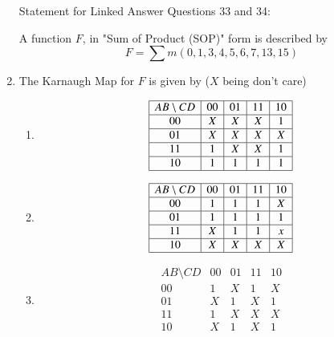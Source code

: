 \documentclass[journal]{IEEEtran}
\begin{document}
\begin{enumerate}
Statement for Linked Answer Questions 33 and 34:

A function $F$, in "Sum of Product (SOP)" form is described by $$F=\sum m(0,1,3,4,5,6,7,13,15)$$

    \item The Karnaugh Map for $F$ is given by ($X$ being don't care)
        \begin{enumerate}
            \item $$
                \begin{array}{|c|c|c|c|c|}
                \hline
                AB \setminus CD & 00 & 01 & 11 & 10 \\
                \hline
                00 & X & X & X & 1 \\
                \hline
                01 & X & X & X & X \\
                \hline
                11 & 1 & X & X & 1 \\
                \hline
                10 & 1 & 1 & 1 & 1 \\
                \hline
            \end{array}
            $$
            \item $$
                \begin{array}{|c|c|c|c|c|}
                \hline
                AB \setminus CD & 00 & 01 & 11 & 10 \\
                \hline
                00 & 1 & 1 & 1 & X \\
                \hline
                01 & 1 & 1 & 1 & 1 \\
                \hline
                11 & X & 1 & 1 & x \\
                \hline
                10 & X & X & X & X \\
                \hline
            \end{array}
            $$
            \item $$
                \begin{array}{|c|c|c|c|c|}
                \hline
                AB \setminus CD & 00 & 01 & 11 & 10 \\
                \hline
                00 & 1 & X & 1 & X \\
                \hline
                01 & X & 1 & X & 1 \\
                \hline
                11 & 1 & X & X & X \\
                \hline
                10 & X & 1 & X & 1 \\

\end{array}$$
\end{enumerate}
\end{enumerate}
\end{document}
